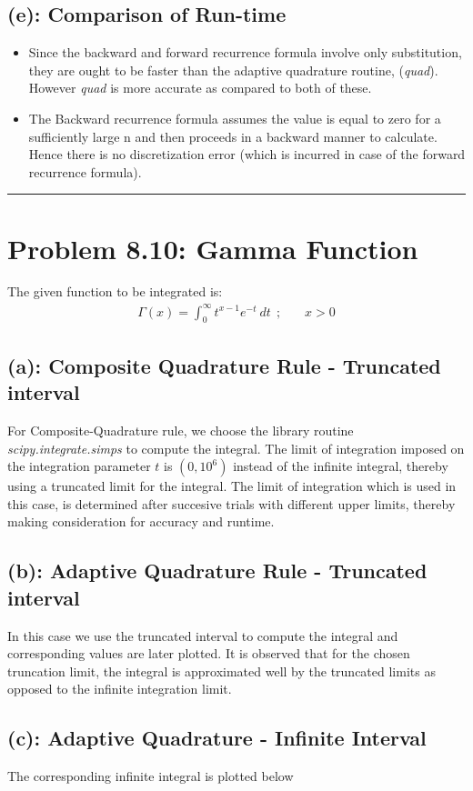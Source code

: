 \subsection*{(e): Comparison of Run-time}
\begin{itemize}
\item Since the backward and forward recurrence formula involve only substitution, they are ought to be faster than the adaptive quadrature routine, (\emph{quad}). However \emph{quad} is more accurate as compared to both of these.
\item The Backward recurrence formula assumes the value is equal to zero for a sufficiently large n and then proceeds in a backward manner to calculate. Hence there is no discretization error (which is incurred in case of the forward recurrence formula).
\end{itemize} \hrule
\newpage\section*{Problem 8.10: Gamma Function}
The given function to be integrated is: 
\begin{align*}
\Gamma(x)
=
\int_{0}^\infty
t^{x-1}
e^{-t}\ dt \ \ ; \ \ \ \ \ \ \ \ x > 0
\end{align*}
\subsection*{(a): Composite Quadrature Rule - Truncated interval}
For Composite-Quadrature rule, we choose the library routine \emph{scipy.integrate.simps} to compute the integral. The limit of integration imposed on the integration parameter $t$ is $(0,10^6)$ instead of the infinite integral, thereby using a truncated limit for the integral. The limit of integration which is used in this case, is determined after succesive trials with different upper limits, thereby making consideration for accuracy and runtime. 
\subsection*{(b): Adaptive Quadrature Rule - Truncated interval }
In this case we use the truncated interval to compute the integral and corresponding values are later plotted. It is observed that for the chosen truncation limit, the integral is approximated well by the truncated limits as opposed to the infinite integration limit. 
\subsection*{(c): Adaptive Quadrature - Infinite Interval}
The corresponding infinite integral is plotted below
